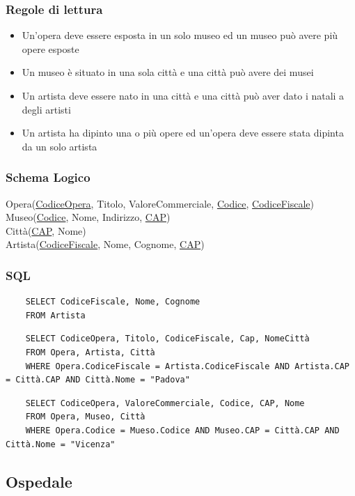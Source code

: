 \documentclass{article}
\begin{document}
	\subsubsection{Regole di lettura}
	\begin{itemize}
		\item Un'opera deve essere esposta in un solo museo ed un museo può avere più opere esposte
		\item Un museo è situato in una sola città e una città può avere dei musei
		\item Un artista deve essere nato in una città e una città può aver dato i natali a degli artisti
		\item Un artista ha dipinto una o più opere ed un'opera deve essere stata dipinta da un solo artista
	\end{itemize}
	\subsubsection{Schema Logico}
	Opera(\underline{CodiceOpera}, Titolo, ValoreCommerciale, \underline{Codice}, \underline{CodiceFiscale})\\
	Museo(\underline{Codice}, Nome, Indirizzo, \underline{CAP})\\
	Città(\underline{CAP}, Nome)\\
	Artista(\underline{CodiceFiscale}, Nome, Cognome, \underline{CAP})
	\subsubsection{SQL}
	\begin{verbatim}
	SELECT CodiceFiscale, Nome, Cognome
	FROM Artista
	\end{verbatim}
	\begin{verbatim}
	SELECT CodiceOpera, Titolo, CodiceFiscale, Cap, NomeCittà
	FROM Opera, Artista, Città
	WHERE Opera.CodiceFiscale = Artista.CodiceFiscale AND Artista.CAP = Città.CAP AND Città.Nome = "Padova"
	\end{verbatim}
	\begin{verbatim}
	SELECT CodiceOpera, ValoreCommerciale, Codice, CAP, Nome
	FROM Opera, Museo, Città
	WHERE Opera.Codice = Mueso.Codice AND Museo.CAP = Città.CAP AND Città.Nome = "Vicenza"
	\end{verbatim}

	\pagebreak
	
	\subsection{Ospedale}
\end{document}
